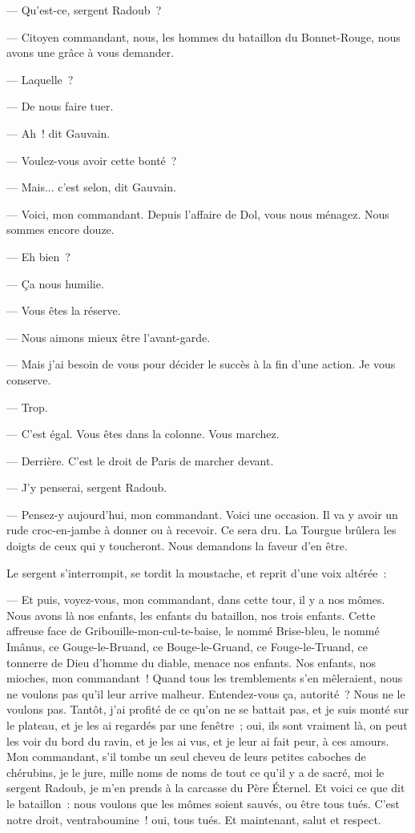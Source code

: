 \documentclass[french,twoside]{book} %
\begin{document}
 — Qu’est-ce, sergent Radoub ?\par
— Citoyen commandant, nous, les hommes du bataillon du Bonnet-Rouge, nous avons une grâce à vous demander.\par
— Laquelle ?\par
— De nous faire tuer.\par
— Ah ! dit Gauvain.\par
— Voulez-vous avoir cette bonté ?\par
— Mais... c’est selon, dit Gauvain.\par
— Voici, mon commandant. Depuis l’affaire de Dol, vous nous ménagez. Nous sommes encore douze.\par
— Eh bien ?\par
— Ça nous humilie.\par
— Vous êtes la réserve.\par
— Nous aimons mieux être l’avant-garde.\par
— Mais j’ai besoin de vous pour décider le succès à la fin d’une action. Je vous conserve.\par
— Trop.\par
— C’est égal. Vous êtes dans la colonne. Vous marchez.\par
— Derrière. C’est le droit de Paris de marcher devant.\par
— J’y penserai, sergent Radoub.\par
— Pensez-y aujourd’hui, mon commandant. Voici une occasion. Il va y avoir un rude croc-en-jambe à donner ou à recevoir. Ce sera dru. La Tourgue brûlera les doigts de ceux qui y toucheront. Nous demandons la faveur d’en être.\par
Le sergent s’interrompit, se tordit la moustache, et reprit d’une voix altérée :\par
 — Et puis, voyez-vous, mon commandant, dans cette tour, il y a nos mômes. Nous avons là nos enfants, les enfants du bataillon, nos trois enfants. Cette affreuse face de Gribouille-mon-cul-te-baise, le nommé Brise-bleu, le nommé Imânus, ce Gouge-le-Bruand, ce Bouge-le-Gruand, ce Fouge-le-Truand, ce tonnerre de Dieu d’homme du diable, menace nos enfants. Nos enfants, nos mioches, mon commandant ! Quand tous les tremblements s’en mêleraient, nous ne voulons pas qu’il leur arrive malheur. Entendez-vous ça, autorité ? Nous ne le voulons pas. Tantôt, j’ai profité de ce qu’on ne se battait pas, et je suis monté sur le plateau, et je les ai regardés par une fenêtre ; oui, ils sont vraiment là, on peut les voir du bord du ravin, et je les ai vus, et je leur ai fait peur, à ces amours. Mon commandant, s’il tombe un seul cheveu de leurs petites caboches de chérubins, je le jure, mille noms de noms de tout ce qu’il y a de sacré, moi le sergent Radoub, je m’en prends à la carcasse du Père Éternel. Et voici ce que dit le bataillon : nous voulons que les mômes soient sauvés, ou être tous tués. C’est notre droit, ventraboumine ! oui, tous tués. Et maintenant, salut et respect.\par
\end{document}
